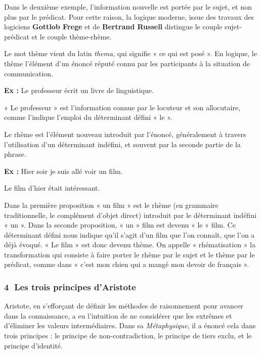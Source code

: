 Dans le deuxième exemple, l’information nouvelle est portée par le sujet, et non plus par le prédicat. Pour cette raison, la logique moderne, issue des travaux des logiciens \textbf{Gottlob Frege} et de \textbf{Bertrand Russell} distingue le couple sujet-prédicat et le couple thème-rhème.

Le mot thème vient du latin \textit{thema}, qui signifie « ce qui est posé ». En logique, le thème l’élément d’un énoncé réputé connu par les participants à la situation de communication.

\noindent\textbf{Ex :} Le professeur écrit un livre de linguistique.

« Le professeur » est l’information connue par le locuteur et son allocutaire, comme l’indique l’emploi du déterminant défini « le ».

Le rhème est l’élément nouveau introduit par l’énoncé, généralement à travers l’utilisation d’un déterminant indéfini, et souvent par la seconde partie de la phrase.

\noindent\textbf{Ex :} Hier soir je suis allé voir un film.

\hspace*{1.5em}Le film d’hier était intéressant.

Dans la première proposition « un film » est le rhème (en grammaire traditionnelle, le complément d’objet direct) introduit par le déterminant indéfini « un ». Dans la seconde proposition, « un »
film est devenu « le » film. Ce déterminant défini nous indique qu’il s’agit d’un film que l’on connaît, que l’on a déjà évoqué. « Le film » est donc devenu thème. On appelle « rhématisation » la transformation qui consiste à faire porter le rhème par le sujet et le thème par le prédicat, comme dans « c’est mon chien qui a mangé mon devoir de français ».

\subsubsection*{\textcircled{\scriptsize 4} Les trois principes d’Aristote}
Aristote, en s’efforçant de définir les méthodes de raisonnement pour avancer dans la connaissance, a eu l’intuition de ne considérer que les extrêmes et d’éliminer les valeurs intermédiaires. Dans sa \textit{Métaphysique}, il a énoncé cela dans trois principes : le principe de non-contradiction, le principe de tiers exclu, et le principe d’identité.

